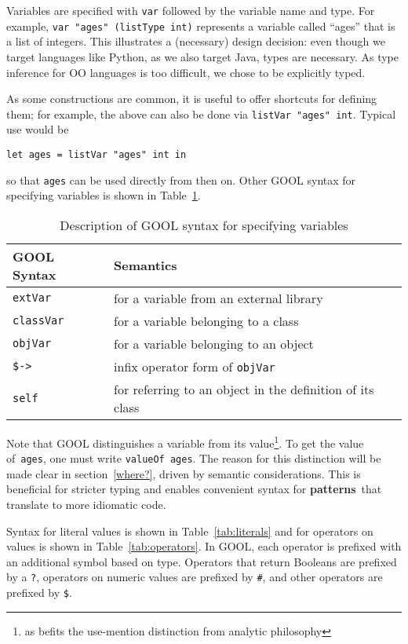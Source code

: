 \documentclass[sigplan,review,anonymous,prologue,dvipsnames]{acmart}
\newcommand{\abbrev}[1]{\textbf{#1}}
\newcommand{\oopatterns}{\abbrev{patterns}}
\begin{document}
Variables are specified with \verb|var| followed by the variable name and type. 
For example, \verb|var "ages" (listType int)| represents a variable called 
``ages'' that is a list of integers. This illustrates a (necessary) design
decision: even though we target languages like Python, as we also target
Java, types are necessary. As type inference for OO languages is too
difficult, we chose to be explicitly typed.

As some constructions are common, it is useful to offer shortcuts for
defining them; for example, the above can also be done via
\verb|listVar "ages" int|. Typical use would be
\begin{lstlisting}
let ages = listVar "ages" int in
\end{lstlisting}
so that \verb|ages| can be used directly from then on. Other GOOL syntax for 
specifying variables is shown in Table~\ref{tab:variables}.

\begin{table}[!h]
\caption{Description of GOOL syntax for specifying variables}
\begin{tabular}{p{} p{}}
	\textbf{GOOL Syntax} & \textbf{Semantics} \\
	\midrule
	\verb|extVar| & for a variable from an external library \\
	\verb|classVar| & for a variable belonging to a class \\
	\verb|objVar| & for a variable belonging to an object \\
	\verb|$->| & infix operator form of \verb|objVar| \\
	\verb|self| & for referring to an object in the definition of its class \\
\end{tabular}
\label{tab:variables}
\end{table}

Note that GOOL distinguishes a variable from its value\footnote{
as befits the use-mention distinction from analytic philosophy}. To get
the value of~\verb|ages|, one must write \verb|valueOf ages|. The reason for
this distinction will be made clear in section~\ref{where?}, driven
by semantic considerations. This is beneficial for stricter typing and
enables convenient syntax for \oopatterns~that translate to more idiomatic
code.

Syntax for literal values is shown in Table~\ref{tab:literals} and for 
operators on values is shown in Table~\ref{tab:operators}. In GOOL, each 
operator is prefixed with an additional symbol based on type. Operators that 
return Booleans are prefixed by a \verb|?|, operators on numeric values are 
prefixed by \verb|#|, and other operators are prefixed by \verb|$|.
\end{document}
